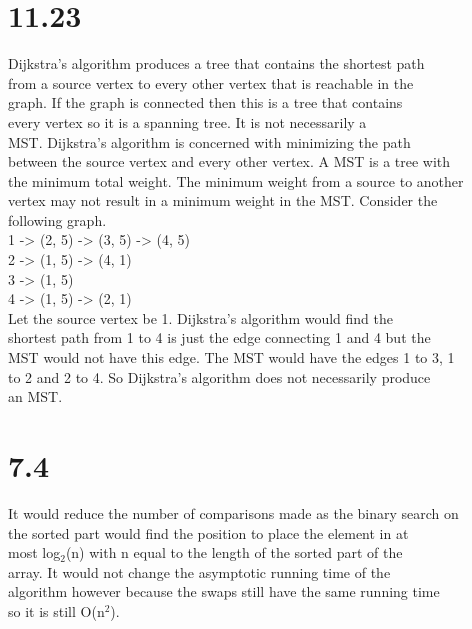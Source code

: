 \documentclass[11pt]{article}
\begin{document}
\section{11.23}
\label{sec:org7b6c33b}
Dijkstra's algorithm produces a tree that contains the shortest path\\
from a source vertex to every other vertex that is reachable in the\\
graph. If the graph is connected then this is a tree that contains\\
every vertex so it is a spanning tree.  It is not necessarily a\\
MST. Dijkstra's algorithm is concerned with minimizing the path\\
between the source vertex and every other vertex. A MST is a tree with\\
the minimum total weight. The minimum weight from a source to another\\
vertex may not result in a minimum weight in the MST. Consider the\\
following graph.\\
1 -> (2, 5) -> (3, 5) -> (4, 5)\\
2 -> (1, 5) -> (4, 1)\\
3 -> (1, 5)\\
4 -> (1, 5) -> (2, 1)\\
Let the source vertex be 1. Dijkstra's algorithm would find the\\
shortest path from 1 to 4 is just the edge connecting 1 and 4 but the\\
MST would not have this edge. The MST would have the edges 1 to 3, 1\\
to 2 and 2 to 4. So Dijkstra's algorithm does not necessarily produce\\
an MST.\\
\section{7.4}
\label{sec:orgd22b727}
It would reduce the number of comparisons made as the binary search on\\
the sorted part would find the position to place the element in at\\
most log\(_{\text{2}}\)(n) with n equal to the length of the sorted part of the\\
array. It would not change the asymptotic running time of the\\
algorithm however because the swaps still have the same running time\\
so it is still O(n\(^{\text{2}}\)).\\
\end{document}
